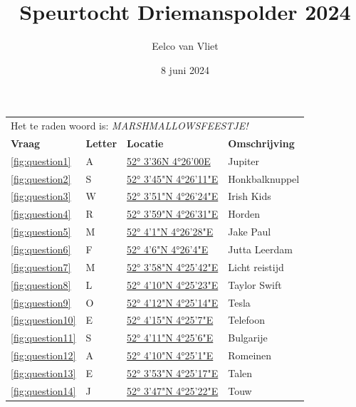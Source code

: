 \documentclass{article}
\title{Speurtocht Driemanspolder 2024}
\author{Eelco van Vliet}
\date{8 juni 2024}
\newcommand{\locone}{52° 3'36N 4°26'00E}
\newcommand{\urlone}{https://forms.gle/88Jf8wcjFSU8aojt8}
\newcommand{\letterone}{A}
\newcommand{\noteone}{Jupiter}
\newcommand{\loctwo}{52° 3'45"N 4°26'11"E}
\newcommand{\urltwo}{https://forms.gle/jwE6WMcVdYzMEdi86}
\newcommand{\lettertwo}{S}
\newcommand{\notetwo}{Honkbalknuppel}
\newcommand{\locthree}{52° 3'51"N 4°26'24"E}
\newcommand{\urlthree}{https://forms.gle/kxh8LWZneB8L2Z3z6}
\newcommand{\letterthree}{W}
\newcommand{\notethree}{Irish Kids}
\newcommand{\locfour}{52° 3'59"N 4°26'31"E}
\newcommand{\urlfour}{https://forms.gle/V9HNHxqCGrrNP5G88}
\newcommand{\letterfour}{R}
\newcommand{\notefour}{Horden}
\newcommand{\locfive}{52° 4'1"N 4°26'28"E}
\newcommand{\urlfive}{https://forms.gle/BCt5xtiF92kuXUrbA}
\newcommand{\letterfive}{M}
\newcommand{\notefive}{Jake Paul}
\newcommand{\locsix}{52° 4'6"N 4°26'4"E}
\newcommand{\urlsix}{https://forms.gle/jiWuTPrYGa8ch47FA}
\newcommand{\lettersix}{F}
\newcommand{\notesix}{Jutta Leerdam}
\newcommand{\locseven}{52° 3'58"N 4°25'42"E}
\newcommand{\urlseven}{ https://forms.gle/ENjzGPWeKBaMmxDN7}
\newcommand{\letterseven}{M}
\newcommand{\noteseven}{Licht reistijd}
\newcommand{\loceight}{52° 4'10"N 4°25'23"E}
\newcommand{\urleight}{https://forms.gle/bpSmFds9fYMj3ThW8}
\newcommand{\lettereight}{L}
\newcommand{\noteeight}{Taylor Swift}
\newcommand{\locnine}{52° 4'12"N 4°25'14"E}
\newcommand{\urlnine}{https://forms.gle/2uKCzoAuqi3J1RTAA}
\newcommand{\letternine}{O}
\newcommand{\notenine}{Tesla}
\newcommand{\locten}{52° 4'15"N   4°25'7"E}
\newcommand{\urlten}{https://forms.gle/9iXk2sc3wtt69EMB7}
\newcommand{\letterten}{E}
\newcommand{\noteten}{Telefoon}
\newcommand{\loceleven}{52° 4'11"N   4°25'6"E}
\newcommand{\urleleven}{https://forms.gle/LuSmoGVzXbCgT9aH8}
\newcommand{\lettereleven}{S}
\newcommand{\noteeleven}{Bulgarije}
\newcommand{\loctwelve}{52° 4'10"N   4°25'1"E}
\newcommand{\urltwelve}{https://forms.gle/ZRpkLsmNRNNmRr127}
\newcommand{\lettertwelve}{A}
\newcommand{\notetwelve}{Romeinen}
\newcommand{\locthirteen}{52° 3'53"N   4°25'17"E}
\newcommand{\urlthirteen}{https://forms.gle/AbXUfJAjqyAwxBBW7}
\newcommand{\letterthirteen}{E}
\newcommand{\notethirteen}{Talen}
\newcommand{\locfourteen}{52° 3'47"N   4°25'22"E}
\newcommand{\urlfourteen}{https://forms.gle/qrCZXwBNYVGaCrxV8}
\newcommand{\letterfourteen}{J}
\newcommand{\notefourteen}{Touw}
\begin{document}
    \maketitle
        \begin{tabular}{llll}
            \toprule
            \multicolumn{4}{l}{Het te raden woord is: \emph{MARSHMALLOWSFEESTJE!}} \\
            \textbf{Vraag} & \textbf{Letter} & \textbf{Locatie} & \textbf{Omschrijving} \\
            \midrule
             \ref{fig:question1} & \letterone & \href{\urlone}{\locone} & \noteone \\
            \ref{fig:question2} & \lettertwo & \href{\urltwo}{\loctwo} & \notetwo \\
            \ref{fig:question3} & \letterthree & \href{\urlthree}{\locthree} & \notethree  \\
            \ref{fig:question4} & \letterfour  & \href{\urlfour}{\locfour} & \notefour \\
            \ref{fig:question5} & \letterfive  & \href{\urlfive}{\locfive} & \notefive \\
            \ref{fig:question6} & \lettersix  & \href{\urlsix}{\locsix} & \notesix \\
            \ref{fig:question7} & \letterseven  & \href{\urlseven}{\locseven} & \noteseven \\
            \ref{fig:question8} & \lettereight  & \href{\urleight}{\loceight} & \noteeight \\
            \ref{fig:question9} & \letternine  & \href{\urlnine}{\locnine} & \notenine \\
            \ref{fig:question10} & \letterten  & \href{\urlten}{\locten} & \noteten \\
            \ref{fig:question11} & \lettereleven  & \href{\urleleven}{\loceleven} & \noteeleven \\
            \ref{fig:question12} & \lettertwelve  & \href{\urltwelve}{\loctwelve} & \notetwelve \\
            \ref{fig:question13} & \letterthirteen  & \href{\urlthirteen}{\locthirteen} & \notethirteen \\
            \ref{fig:question14} & \letterfourteen  & \href{\urlfourteen}{\locfourteen} & \notefourteen \\

\end{tabular}
\end{document}

